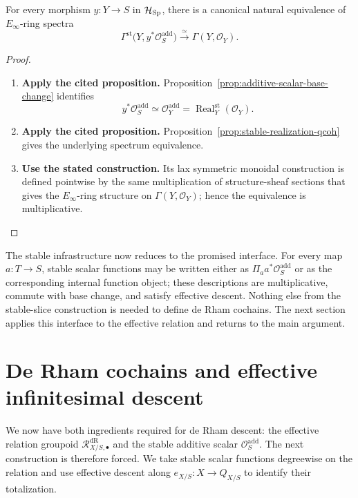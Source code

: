 \begin{proposition}
\label{prop:stable-scalar-sections-represented}
For every morphism \(y:Y\to S\) in \(\mathcal H_{\operatorname{Sp}}\), there is a
canonical natural equivalence of \(E_\infty\)-ring spectra
\[
  \Gamma^{\mathrm{st}}
  \bigl(Y,y^*\mathcal O_S^{\mathrm{add}}\bigr)
  \xrightarrow{\simeq}
  \Gamma(Y,\mathcal O_Y).
\]

\end{proposition}

\begin{proof}
\leavevmode
\begin{enumerate}[label=\textup{(\arabic*)}]
    \item \textbf{Apply the cited proposition.}
    Proposition~\ref{prop:additive-scalar-base-change} identifies
    \[
    y^*\mathcal O_S^{\mathrm{add}}
    \simeq
    \mathcal O_Y^{\mathrm{add}}
    =
    \operatorname{Real}^{\mathrm{st}}_Y(\mathcal O_Y).
    \]
    \item \textbf{Apply the cited proposition.}
    Proposition~\ref{prop:stable-realization-qcoh} gives the underlying spectrum
    equivalence.
    \item \textbf{Use the stated construction.}
    Its lax symmetric monoidal construction is defined pointwise by the
    same multiplication of structure-sheaf sections that gives the
    \(E_\infty\)-ring structure on \(\Gamma(Y,\mathcal O_Y)\); hence the equivalence
    is multiplicative.
\end{enumerate}
\end{proof}


The stable infrastructure now reduces to the promised interface. For every
map \(a:T\to S\), stable scalar functions may be written either as
\(\Pi_a a^*\mathcal O_S^{\mathrm{add}}\) or as the corresponding internal
function object; these descriptions are multiplicative, commute with base
change, and satisfy effective descent. Nothing else from the stable-slice
construction is needed to define de Rham cochains. The next section applies
this interface to the effective relation and returns to the main argument.
\section{De Rham cochains and effective infinitesimal descent}
\label{sec:de-Rham-scalar-descent}

We now have both ingredients required for de Rham descent: the effective
relation groupoid
\(\mathcal R^{\mathrm{dR}}_{X/S,\bullet}\) and the stable additive scalar
\(\mathcal O_S^{\mathrm{add}}\). The next construction is therefore forced.
We take stable scalar functions degreewise on the relation and use effective
descent along \(e_{X/S}:X\to Q_{X/S}\) to identify their totalization.

